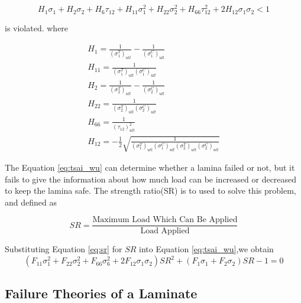\documentclass[smallextended]{svjour3}       %
\begin{document}
\begin{equation} \label{eq:tsai_wu}
H_1 \sigma_1 + H_2 \sigma_2 + H_6 \tau_{12} + H_{11}\sigma_1^2 + H_{22} \sigma_2^2 + H_{66}
\tau_{12}^2 + 2H_{12}\sigma_1\sigma_2 < 1
\end{equation}
 
is violated. where


\begin{equation}
	\begin{array}{l}
		H_{1}=\frac{1}{\left(\sigma_{1}^{T}\right)_{u l t}}-\frac{1}{\left(\sigma_{1}^{C}\right)_{u l
	t}} \\
	H_{11}=\frac{1}{\left(\sigma_{1}^{T}\right)_{u l t}\left(\sigma_{1}^{C}\right)_{u l t}} \\
	H_{2}=\frac{1}{\left(\sigma_{2}^{T}\right)_{u l t}}-\frac{1}{\left(\sigma_{2}^{C}\right)_{u l
	t}} \\
	H_{22}=\frac{1}{\left(\sigma_{2}^{T}\right)_{u l t}\left(\sigma_{2}^{C}\right)_{u l t}} \\
	H_{66}=\frac{1}{\left(\tau_{12}\right)_{u l t}^{2}} \\
	H_{12}=-\frac{1}{2} \sqrt{\frac{1}{\left(\sigma_{1}^{T}\right)_{u l
				t}\left(\sigma_{1}^{C}\right)_{u l t}\left(\sigma_{2}^{T}\right)_{u l
	t}\left(\sigma_{2}^{C}\right)_{u l t}}}
	\end{array}
\end{equation}


The Equation \ref{eq:tsai_wu} can determine whether a lamina failed or not, but it fails to give the
information about how much load can be increased or decreased to keep the lamina safe. The strength
ratio(SR) is to used to solve this problem, and defined as

\begin{equation} \label{eq:sr}
	S R=\frac{\text {Maximum Load Which Can Be Applied}}{\text {Load Applied}}
\end{equation}


Substituting Equation \ref{eq:sr} for $SR$ into Equation \ref{eq:tsai_wu},we obtain
\begin{equation}
		(F_{11}\sigma_1^2+F_{22}\sigma_2^2+F_{66}\sigma_6^2+2F_{12}\sigma_1\sigma_2)SR^2 
						 +(F_1\sigma_1+F_2\sigma_2)SR-1=0
\end{equation}




\subsection{Failure Theories of a Laminate}
\end{document}
